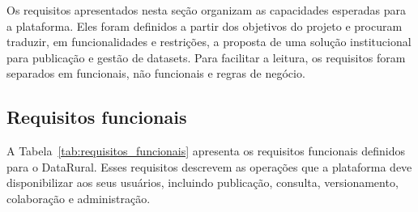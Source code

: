 Os requisitos apresentados nesta seção organizam as capacidades esperadas para a plataforma. Eles foram definidos a partir dos objetivos do projeto e procuram traduzir, em funcionalidades e restrições, a proposta de uma solução institucional para publicação e gestão de datasets. Para facilitar a leitura, os requisitos foram separados em funcionais, não funcionais e regras de negócio.

\subsection{Requisitos funcionais}

A Tabela~\ref{tab:requisitos_funcionais} apresenta os requisitos funcionais definidos para o DataRural. Esses requisitos descrevem as operações que a plataforma deve disponibilizar aos seus usuários, incluindo publicação, consulta, versionamento, colaboração e administração.

